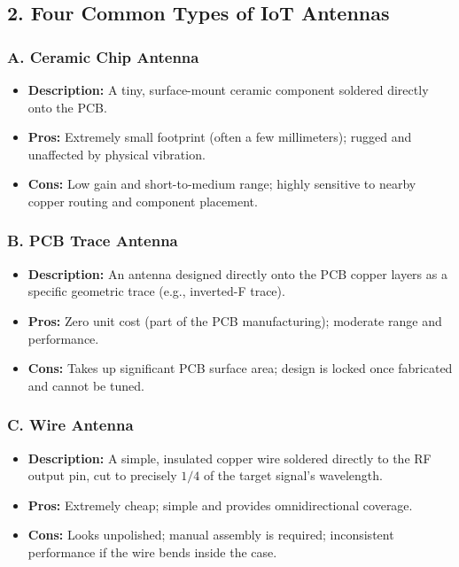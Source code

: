 \subsection{2. Four Common Types of IoT Antennas}

\subsubsection{A. Ceramic Chip Antenna}
\begin{itemize}
  \item   \textbf{Description:} A tiny, surface-mount ceramic component soldered directly onto the PCB.
  \item   \textbf{Pros:} Extremely small footprint (often a few millimeters); rugged and unaffected by physical vibration.
  \item   \textbf{Cons:} Low gain and short-to-medium range; highly sensitive to nearby copper routing and component placement.
\end{itemize}

\subsubsection{B. PCB Trace Antenna}
\begin{itemize}
  \item   \textbf{Description:} An antenna designed directly onto the PCB copper layers as a specific geometric trace (e.g., inverted-F trace).
  \item   \textbf{Pros:} Zero unit cost (part of the PCB manufacturing); moderate range and performance.
  \item   \textbf{Cons:} Takes up significant PCB surface area; design is locked once fabricated and cannot be tuned.
\end{itemize}

\subsubsection{C. Wire Antenna}
\begin{itemize}
  \item   \textbf{Description:} A simple, insulated copper wire soldered directly to the RF output pin, cut to precisely $1/4$ of the target signal's wavelength.
  \item   \textbf{Pros:} Extremely cheap; simple and provides omnidirectional coverage.
  \item   \textbf{Cons:} Looks unpolished; manual assembly is required; inconsistent performance if the wire bends inside the case.
\end{itemize}

